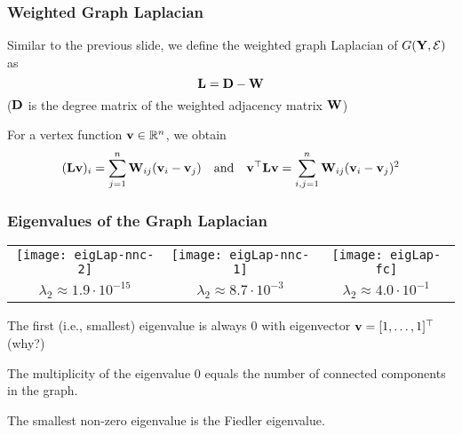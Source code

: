 \documentclass[12pt,handout]{beamer}
\begin{document}
\begin{frame}
\frametitle{Weighted Graph Laplacian }

Similar to the previous slide, we define the weighted graph Laplacian of $G({\bf Y},{\cal E})$ as
$$ {\bf L} = {\bf D}  - {\bf W}$$ 
(${\bf D}$ is the degree matrix of the weighted adjacency matrix ${\bf W}$)

\bigskip

For a vertex function ${\bf v} \in \mathbb{R}^n$, we obtain
$$ ({\bf L} {\bf v})_i =  \sum_{j=1}^n {\bf W}_{ij} ({\bf v}_i - {\bf v}_j) \quad \text{and} \quad {\bf v}^{\top}{\bf L} {\bf v} =  \sum_{i,j=1}^n  {\bf W}_{ij}({\bf v}_i - {\bf v}_j)^2$$



\end{frame}

\begin{frame}
\frametitle{Eigenvalues of the Graph Laplacian}
\begin{center}
	\iwidth=32mm
\begin{tabular}{@{}c@{}c@{}c@{}}
	\texttt{[image: eigLap-nnc-2]} & 
	\texttt{[image: eigLap-nnc-1]} & 
	\texttt{[image: eigLap-fc]} \\ 
	\scriptsize $\lambda_2 \approx 1.9\cdot 10^{-15}$ &
	\scriptsize $\lambda_2 \approx 8.7\cdot 10^{-3}$ &
	\scriptsize $\lambda_2 \approx 4.0\cdot 10^{-1}$ \\
\end{tabular}
\end{center}
The first (i.e., smallest) eigenvalue is always $0$ with eigenvector ${\bf v} = [1,\ldots,1]^{\top}$ (why?)

\bigskip

The multiplicity of the eigenvalue $0$ equals the number of connected components in the graph.

\bigskip

The smallest non-zero eigenvalue is the Fiedler eigenvalue.

\end{frame}
\end{document}
